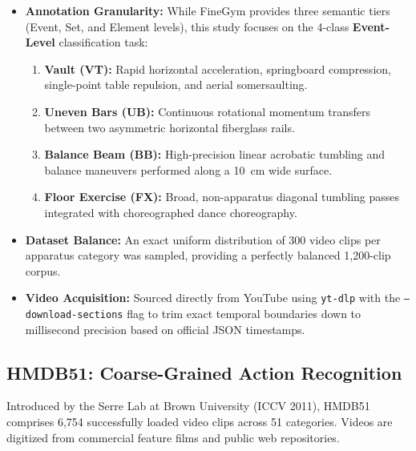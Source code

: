 \documentclass[a4paper, 11pt]{article}
\begin{document}
\begin{itemize}
    \item \textbf{Annotation Granularity:} While FineGym provides three semantic tiers (Event, Set, and Element levels), this study focuses on the 4-class \textbf{Event-Level} classification task:
    \begin{enumerate}
        \item \textbf{Vault (VT):} Rapid horizontal acceleration, springboard compression, single-point table repulsion, and aerial somersaulting.
        \item \textbf{Uneven Bars (UB):} Continuous rotational momentum transfers between two asymmetric horizontal fiberglass rails.
        \item \textbf{Balance Beam (BB):} High-precision linear acrobatic tumbling and balance maneuvers performed along a 10~cm wide surface.
        \item \textbf{Floor Exercise (FX):} Broad, non-apparatus diagonal tumbling passes integrated with choreographed dance choreography.
    \end{enumerate}
    \item \textbf{Dataset Balance:} An exact uniform distribution of 300 video clips per apparatus category was sampled, providing a perfectly balanced 1,200-clip corpus.
    \item \textbf{Video Acquisition:} Sourced directly from YouTube using \texttt{yt-dlp} with the \texttt{--download-sections} flag to trim exact temporal boundaries down to millisecond precision based on official JSON timestamps.
\end{itemize}

\subsection{HMDB51: Coarse-Grained Action Recognition}
Introduced by the Serre Lab at Brown University (ICCV 2011), HMDB51 comprises 6,754 successfully loaded video clips across 51 categories. Videos are digitized from commercial feature films and public web repositories.
\end{document}
